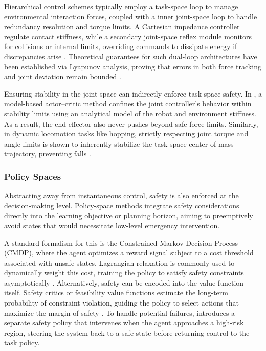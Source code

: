 \documentclass[Afour,sageh,times]{template/sagej}
\begin{document}
Hierarchical control schemes typically employ a task-space loop to manage environmental interaction forces, coupled with a inner joint-space loop to handle redundancy resolution and torque limits. A Cartesian impedance controller regulate contact stiffness, while a secondary joint-space reflex module monitors for collisions or internal limits, overriding commands to dissipate energy if discrepancies arise \cite{66}. Theoretical guarantees for such dual-loop architectures have been established via Lyapunov analysis, proving that errors in both force tracking and joint deviation remain bounded \cite{56}.

Ensuring stability in the joint space can indirectly enforce task-space safety. In \cite{88}, a model-based actor–critic method confines the joint controller’s behavior within stability limits using an analytical model of the robot and environment stiffness. As a result, the end-effector also never pushes beyond safe force limits. Similarly, in dynamic locomotion tasks like hopping, strictly respecting joint torque and angle limits is shown to inherently stabilize the task-space center-of-mass trajectory, preventing falls \cite{101}.

\subsubsection{Policy Spaces}
Abstracting away from instantaneous control, safety is also enforced at the decision-making level. Policy-space methods integrate safety considerations directly into the learning objective or planning horizon, aiming to preemptively avoid states that would necessitate low-level emergency intervention.

A standard formalism for this is the Constrained Markov Decision Process (CMDP), where the agent optimizes a reward signal subject to a cost threshold associated with unsafe states. Lagrangian relaxation is commonly used to dynamically weight this cost, training the policy to satisfy safety constraints asymptotically \cite{33}. Alternatively, safety can be encoded into the value function itself. Safety critics or feasibility value functions estimate the long-term probability of constraint violation, guiding the policy to select actions that maximize the margin of safety \cite{45}. To handle potential failures, \cite{91} introduces a separate safety policy that intervenes when the agent approaches a high-risk region, steering the system back to a safe state before returning control to the task policy. 
\end{document}
